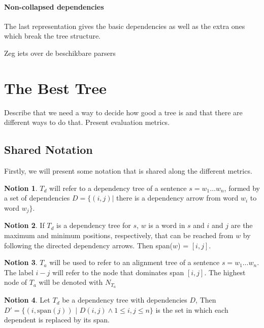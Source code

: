 \documentclass{report}
\theoremstyle{definition}
\newtheorem{notion}{Notion}
\theoremstyle{plain}
\begin{document}
\paragraph{Non-collapsed dependencies} The last representation gives the basic dependencies as well as the extra ones which break the tree structure.

Zeg iets over de beschikbare parsers \cite{de2006generating}

\section{The Best Tree}

Describe that we need a way to decide how good a tree is and that there are different ways to do that. Present evaluation metrics.

\subsection{Shared Notation}

Firstly, we will present some notation that is shared along the different metrics.

\begin{notion}
$T_d$ will refer to a dependency tree of a sentence $s = w_1 \dots w_n$, formed by a set of dependencies $D = \{ (i,j) |$ there is a dependency arrow from word $w_i$ to word $w_j \}$.
\end{notion}

\begin{notion}
If $T_d$ is a dependency tree for $s$, $w$ is a word in $s$ and $i$ and $j$ are the maximum and minimum positions, respectively, that can be reached from $w$ by following the directed dependency arrows. Then span($w$) = $[i,j]$.
\end{notion}

\begin{notion}
$T_a$ will be used to refer to an alignment tree of a sentence $s = w_1 \dots w_n$. The label $i-j$ will refer to the node that dominates span $[i,j]$. The highest node of $T_a$ will be denoted with $N_{T_a}$
\end{notion}

\begin{notion}
Let $T_d$ be a dependency tree with dependencies $D$, Then $D' = \{ (i,\textrm{span}(j))$ $|$ $D(i,j) \land 1 \leq i,j \leq n \}$ is the set in which each dependent is replaced by its span.
\end{notion}
\end{document}
